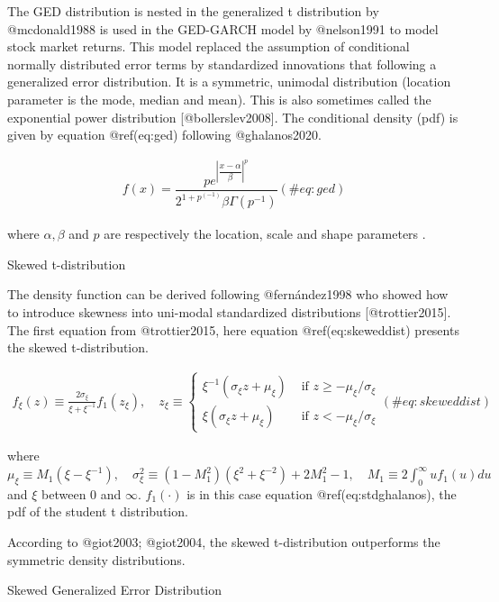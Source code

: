 \documentclass[
]{article}
\begin{document}
\noindent The GED distribution is nested in the generalized t
distribution by @mcdonald1988 is used in the GED-GARCH model by
@nelson1991 to model stock market returns. This model replaced the
assumption of conditional normally distributed error terms by
standardized innovations that following a generalized error
distribution. It is a symmetric, unimodal distribution (location
parameter is the mode, median and mean). This is also sometimes called
the exponential power distribution {[}@bollerslev2008{]}. The
conditional density (pdf) is given by equation @ref(eq:ged) following
@ghalanos2020.

\begin{align}
f(x) = \dfrac{p e^{\left|\dfrac{x-\alpha}{\beta}\right|^p}}{2^{1+p^(-1)}\beta\Gamma(p^{-1})}
 (\#eq:ged)
\end{align}

where \(\alpha, \beta\) and \(p\) are respectively the location, scale
and shape parameters .

Skewed t-distribution

\noindent The density function can be derived following @fernández1998
who showed how to introduce skewness into uni-modal standardized
distributions {[}@trottier2015{]}. The first equation from
@trottier2015, here equation @ref(eq:skeweddist) presents the skewed
t-distribution.

\begin{align}
f_{\xi}(z) \equiv \frac{2 \sigma_{\xi}}{\xi+\xi^{-1}} f_{1}\left(z_{\xi}\right), \quad z_{\xi} \equiv\left\{\begin{array}{ll}
\xi^{-1}\left(\sigma_{\xi} z+\mu_{\xi}\right) & \text { if } z \geq-\mu_{\xi} / \sigma_{\xi} \\
\xi\left(\sigma_{\xi} z+\mu_{\xi}\right) & \text { if } z<-\mu_{\xi} / \sigma_{\xi}
\end{array}\right.
 (\#eq:skeweddist)
\end{align}

\noindent where
\(\mu_{\xi} \equiv M_{1}\left(\xi-\xi^{-1}\right), \quad \sigma_{\xi}^{2} \equiv\left(1-M_{1}^{2}\right)\left(\xi^{2}+\xi^{-2}\right)+2 M_{1}^{2}-1, \quad M_{1} \equiv 2 \int_{0}^{\infty} u f_{1}(u) d u\)
and \(\xi\) between \(0\) and \(\infty\). \(f_1(\cdot)\) is in this case
equation @ref(eq:stdghalanos), the pdf of the student t distribution.

\noindent According to @giot2003; @giot2004, the skewed t-distribution
outperforms the symmetric density distributions.

Skewed Generalized Error Distribution
\end{document}
